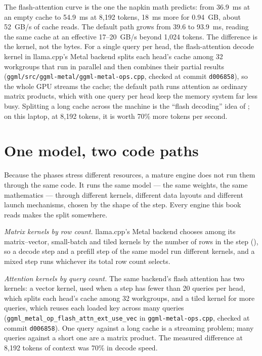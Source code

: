 The flash-attention curve is the one the napkin math predicts: from 36.9~ms at
an empty cache to 54.9~ms at 8,192 tokens, 18~ms more for 0.94~GB, about
52~GB/s of cache reads. The default path grows from 39.6 to 93.9~ms, reading the
same cache at an effective 17--20~GB/s beyond 1,024 tokens. The difference is
the kernel, not the bytes. For a single query per head, the flash-attention
decode kernel in llama.cpp's Metal backend splits each head's cache among 32
workgroups that run in parallel and then combines their partial results
(\texttt{ggml/src/ggml-metal/ggml-metal-ops.cpp}, checked at commit
\texttt{d006858}), so the whole GPU streams the cache; the default path runs
attention as ordinary matrix products, which with one query per head keep the
memory system far less busy. Splitting a long cache across the machine is the ``flash
decoding'' idea of ; on this laptop, at 8,192 tokens, it
is worth 70\% more tokens per second.

\section{One model, two code paths}

Because the phases stress different resources, a mature engine does not run
them through the same code. It runs the same model --- the same weights, the
same mathematics --- through different kernels, different data layouts and
different launch mechanisms, chosen by the shape of the step. Every engine
this book reads makes the split somewhere.

\emph{Matrix kernels by row count.} llama.cpp's Metal backend chooses among its
matrix--vector, small-batch and tiled kernels by the number of rows in the step
(), so a decode step and a prefill step of the same model run
different kernels, and a mixed step runs whichever its total row count selects.

\emph{Attention kernels by query count.} The same backend's flash attention has
two kernels: a vector kernel, used when a step has fewer than 20 queries per
head, which splits each head's cache among 32 workgroups, and a tiled kernel for
more queries, which reuses each loaded key across many queries
(\texttt{ggml\_metal\_op\_flash\_attn\_ext\_use\_vec} in
\texttt{ggml-metal-ops.cpp}, checked at commit \texttt{d006858}). One query
against a long cache is a streaming problem; many queries against a short one
are a matrix product. The measured difference at 8,192 tokens of context was
70\% in decode speed.

